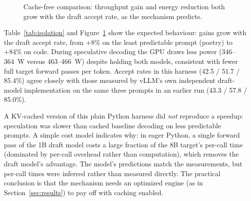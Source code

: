 \documentclass[conference]{IEEEtran}
\begin{document}
\begin{figure}[t]
\centering
{}
\caption{Cache-free comparison: throughput gain and energy reduction both
grow with the draft accept rate, as the mechanism predicts.}
\label{fig:accept}
\end{figure}

Table~\ref{tab:isolation} and Figure~\ref{fig:accept} show the expected
behaviour: gains grow with the draft accept rate, from +8\% on the least
predictable prompt (poetry) to +84\% on code. During speculative decoding
the GPU draws less power (346--364~W versus 463--466~W) despite holding
both models, consistent with fewer full target forward passes per token.
Accept rates in this harness (42.5 / 51.7 / 85.4\%) agree closely with
those measured by vLLM's own independent draft-model implementation on the
same three prompts in an earlier run (43.3 / 57.8 / 85.0\%).

A KV-cached version of this plain Python harness did \emph{not} reproduce a
speedup: speculation was slower than cached baseline decoding on less
predictable prompts. A simple cost model indicates why: in eager Python, a
single forward pass of the 1B draft model costs a large fraction of the 8B
target's per-call time (dominated by per-call overhead rather than
computation), which removes the draft model's advantage. The model's
predictions match the measurements, but per-call times were inferred rather
than measured directly. The practical conclusion is that the mechanism
needs an optimized engine (as in Section~\ref{sec:results}) to pay off with
caching enabled.
\end{document}

